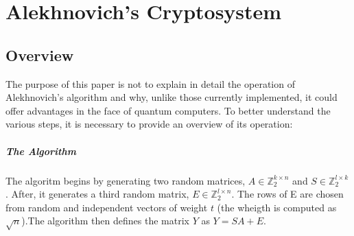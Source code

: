 \section{Alekhnovich's Cryptosystem}
\subsection{Overview}
The purpose of this paper is not to explain in detail the operation of Alekhnovich's algorithm and why, unlike those currently implemented, it could offer advantages in the face of quantum computers. To better understand the various steps, it is necessary to provide an overview of its operation:
\subparagraph{The Algorithm} The algoritm begins by generating two random matrices, $A\in \mathbb{Z}^{k\times n}_2$ and $S\in \mathbb{Z}^{l\times k}_2$. After, it generates a third random matrix, $E\in \mathbb{Z}^{l\times n}_2$. The rows of E are chosen from random and independent vectors of weight $t$ (the wheigth is computed as $\sqrt{n}$).The algorithm then defines the matrix $Y$ as $Y = SA + E$.


